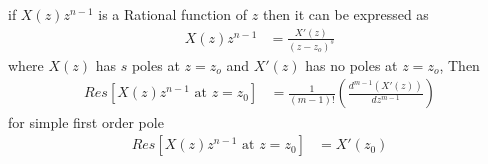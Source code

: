 \documentclass[journal,12pt,onecolumn]{IEEEtran}
\theoremstyle{remark}
\providecommand{\sbrak}[1]{\ensuremath{{}\left[#1\right]}}
\providecommand{\brak}[1]{\ensuremath{\left(#1\right)}}
\begin{document}
if $X\brak{z}z^{n-1}$ is a Rational function of $z$ then it can be expressed as
\begin{align}
    X\brak{z} z^{n-1} & = \frac{X'\brak{z}}{\brak{z-z_o}^s}
\end{align}
where $X\brak{z}$ has $s$ poles at $z=z_o$ and $X'\brak{z}$ has no poles at $z = z_o$, Then
\begin{align}
    Res\sbrak{X\brak{z}z^{n-1} \text{ at } z=z_0} & = \frac{1}{\brak{m-1}!} \brak{\frac{d^{m-1}\brak{X'\brak{z}}}{dz^{m-1}}}
\end{align}
for simple first order pole
\begin{align}
    Res\sbrak{X\brak{z}z^{n-1} \text{ at } z=z_0} & = X'\brak{z_0}
\end{align}
\end{document}
